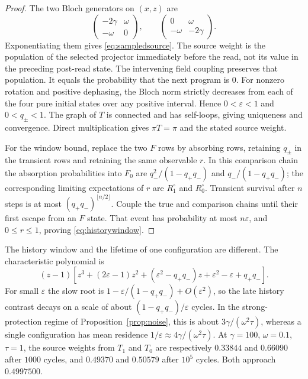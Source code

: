 \documentclass[12pt,a4paper]{article}
\begin{document}
\begin{proof}
The two Bloch generators on $(x,z)$ are
\[
 \begin{pmatrix}-2\gamma&\omega\\-\omega&0\end{pmatrix},
 \qquad
 \begin{pmatrix}0&\omega\\-\omega&-2\gamma\end{pmatrix}.
\]
Exponentiating them gives \eqref{eq:sampledsource}. The source weight is the population of the selected projector immediately before the read, not its value in the preceding post-read state. The intervening field coupling preserves that population. It equals the probability that the next program is $0$. For nonzero rotation and positive dephasing, the Bloch norm strictly decreases from each of the four pure initial states over any positive interval. Hence $0<\varepsilon<1$ and $0<q_\pm<1$. The graph of $T$ is connected and has self-loops, giving uniqueness and convergence. Direct multiplication gives $\pi T=\pi$ and the stated source weight.

For the window bound, replace the two $F$ rows by absorbing rows, retaining $q_\pm$ in the transient rows and retaining the same observable $r$. In this comparison chain the absorption probabilities into $F_0$ are $q_-^2/(1-q_+q_-)$ and $q_-/(1-q_+q_-)$; the corresponding limiting expectations of $r$ are $R^\circ_1$ and $R^\circ_0$. Transient survival after $n$ steps is at most $(q_+q_-)^{\lfloor n/2\rfloor}$. Couple the true and comparison chains until their first escape from an $F$ state. That event has probability at most $n\varepsilon$, and $0\le r\le1$, proving \eqref{eq:historywindow}.
\end{proof}

The history window and the lifetime of one configuration are different. The characteristic polynomial is
\[
 (z-1)\left[z^3+(2\varepsilon-1)z^2+
 (\varepsilon^2-q_+q_-)z+\varepsilon^2-\varepsilon+q_+q_-\right].
\]
For small $\varepsilon$ the slow root is
$1-\varepsilon/(1-q_+q_-)+O(\varepsilon^2)$, so the late history contrast decays on a scale of about $(1-q_+q_-)/\varepsilon$ cycles. In the strong-protection regime of Proposition~\ref{prop:noise}, this is about $3\gamma/(\omega^2\tau)$, whereas a single configuration has mean residence $1/\varepsilon\approx4\gamma/(\omega^2\tau)$. At $\gamma=100$, $\omega=0.1$, $\tau=1$, the source weights from $T_1$ and $T_0$ are respectively $0.33844$ and $0.66090$ after $1000$ cycles, and $0.49370$ and $0.50579$ after $10^5$ cycles. Both approach $0.4997500$.
\end{document}
